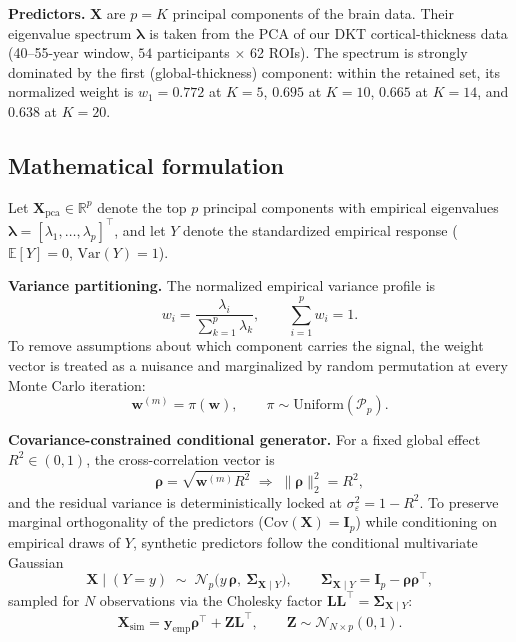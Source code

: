 \documentclass[11pt,a4paper]{article}
\begin{document}
\textbf{Predictors.} $\mathbf{X}$ are $p=K$ principal components of the brain data. Their eigenvalue spectrum $\bm\lambda$ is taken from the PCA of our DKT cortical-thickness data (40--55-year window, $54$ participants $\times$ 62 ROIs). The spectrum is strongly dominated by the first (global-thickness) component: within the retained set, its normalized weight is $w_1=0.772$ at $K=5$, $0.695$ at $K=10$, $0.665$ at $K=14$, and $0.638$ at $K=20$.

\subsection{Mathematical formulation}

Let $\mathbf{X}_{\mathrm{pca}}\in\mathbb{R}^{p}$ denote the top $p$ principal components with empirical eigenvalues $\bm\lambda=[\lambda_1,\dots,\lambda_p]^{\top}$, and let $Y$ denote the standardized empirical response ($\mathbb{E}[Y]=0$, $\mathrm{Var}(Y)=1$).

\textbf{Variance partitioning.} The normalized empirical variance profile is
\begin{equation}
w_i=\frac{\lambda_i}{\sum_{k=1}^{p}\lambda_k},\qquad \sum_{i=1}^{p}w_i=1 .
\end{equation}
To remove assumptions about which component carries the signal, the weight vector is treated as a nuisance and marginalized by random permutation at every Monte Carlo iteration:
\begin{equation}
\mathbf{w}^{(m)}=\pi(\mathbf{w}),\qquad \pi\sim\mathrm{Uniform}(\mathcal{P}_p).
\end{equation}

\textbf{Covariance-constrained conditional generator.} For a fixed global effect $R^2\in(0,1)$, the cross-correlation vector is
\begin{equation}
\bm\rho=\sqrt{\mathbf{w}^{(m)}R^2}\;\Longrightarrow\;\lVert\bm\rho\rVert_2^{2}=R^2 ,
\end{equation}
and the residual variance is deterministically locked at $\sigma_\varepsilon^{2}=1-R^{2}$. To preserve marginal orthogonality of the predictors ($\mathrm{Cov}(\mathbf{X})=\mathbf{I}_p$) while conditioning on empirical draws of $Y$, synthetic predictors follow the conditional multivariate Gaussian
\begin{equation}
\mathbf{X}\mid (Y=y)\;\sim\;\mathcal{N}_p\!\bigl(y\,\bm\rho,\ \bm\Sigma_{\mathbf{X}\mid Y}\bigr),
\qquad
\bm\Sigma_{\mathbf{X}\mid Y}=\mathbf{I}_p-\bm\rho\bm\rho^{\top},
\end{equation}
sampled for $N$ observations via the Cholesky factor $\mathbf{L}\mathbf{L}^{\top}=\bm\Sigma_{\mathbf{X}\mid Y}$:
\begin{equation}
\mathbf{X}_{\mathrm{sim}}=\mathbf{y}_{\mathrm{emp}}\bm\rho^{\top}+\mathbf{Z}\mathbf{L}^{\top},
\qquad \mathbf{Z}\sim\mathcal{N}_{N\times p}(0,1).
\end{equation}
\end{document}
